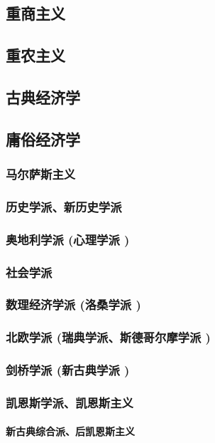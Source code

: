 \documentclass[UTF8]{../../RepresentationUniverse}
\begin{document}
    \subsection{重商主义}
    \subsection{重农主义}
    \subsection{古典经济学}
    \subsection{庸俗经济学}
        \subsubsection{马尔萨斯主义}
        \subsubsection{历史学派、新历史学派}
        \subsubsection{奥地利学派 (心理学派 )}
        \subsubsection{社会学派}
        \subsubsection{数理经济学派 (洛桑学派 )}
        \subsubsection{北欧学派 (瑞典学派、斯德哥尔摩学派 )}
        \subsubsection{剑桥学派 (新古典学派 )}
        \subsubsection{凯恩斯学派、凯恩斯主义}
            \paragraph{新古典综合派、后凯恩斯主义}
\end{document}
